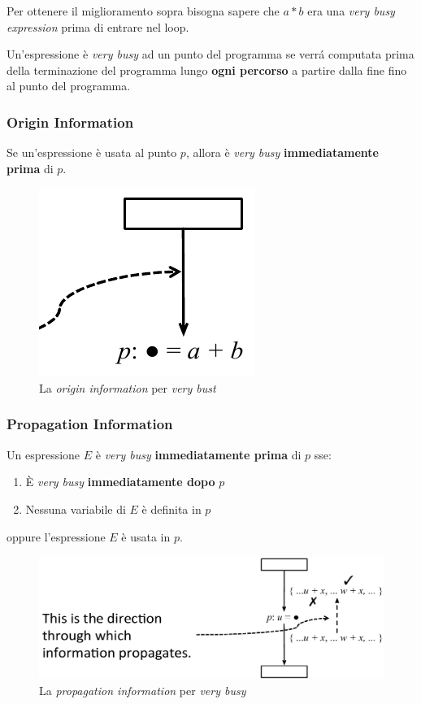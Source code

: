 Per ottenere il miglioramento sopra bisogna sapere che $a*b$ era una
\textit{very busy expression} prima di entrare nel loop.

\begin{definition}
Un'espressione \`e \textit{very busy} ad un punto del programma se verr\'a
computata prima della terminazione del programma lungo \textbf{ogni percorso}
a partire dalla fine fino al punto del programma.
\end{definition}

\subsubsection{Origin Information}
Se un'espressione \`e usata al punto $p$, allora \`e \textit{very busy}
\textbf{immediatamente prima} di $p$.

\begin{figure}[H]
  \centering
  \includegraphics[scale=0.4]{res/image/origin_very-busy}
  \caption{La \textit{origin information} per \textit{very bust}}
  \label{img:orgin_very-busy}
\end{figure}

\subsubsection{Propagation Information}
Un espressione $E$ \`e \textit{very busy} \textbf{immediatamente prima} di $p$
sse:
\begin{enumerate}
\item \`E \textit{very busy} \textbf{immediatamente dopo} $p$
\item Nessuna variabile di $E$ \`e definita in $p$
\end{enumerate}

oppure l'espressione $E$ \`e usata in $p$.

\begin{figure}[H]
  \centering
  \includegraphics[scale=0.4]{res/image/propagation_very-busy}
  \caption{La \textit{propagation information} per \textit{very busy}}
  \label{img:propagation_very-busy}
\end{figure}


